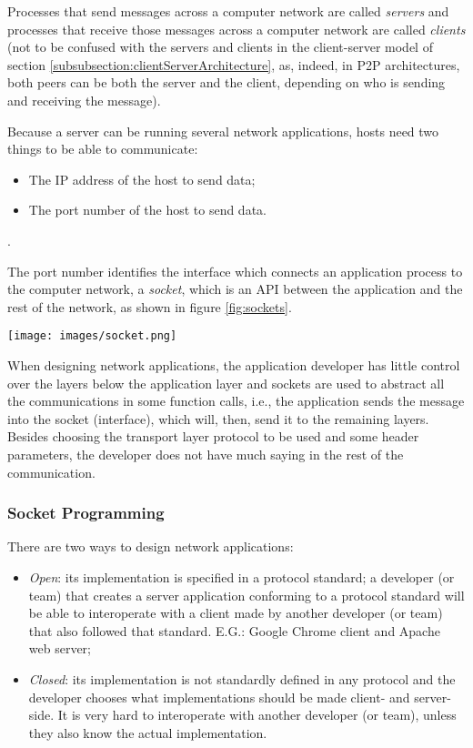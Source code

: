 Processes that send messages across a computer network are called \textit{servers} and processes that receive those messages across a computer network are called \textit{clients} (not to be confused with the servers and clients in the client-server model of section \ref{subsubsection:clientServerArchitecture}, as, indeed, in \ac{P2P} architectures, both peers can be both the server and the client, depending on who is sending and receiving the message).

Because a server can be running several network applications, hosts need two things to be able to communicate:

\begin{itemize}
  \item The \acs{IP} address of the host to send data;
  \item The port number of the host to send data.
\end{itemize}.

The port number identifies the interface which connects an application process to the computer network, a \textit{socket}, which is an \ac{API} between the application and the rest of the network, as shown in figure \ref{fig:sockets}.

\begin{figure*}[!t]
\centering
\texttt{[image: images/socket.png]}
\caption{Communication between a server and a client through the Internet using sockets}
\label{fig:sockets}
\end{figure*}

When designing network applications, the application developer has little control over the layers below the application layer and sockets are used to abstract all the communications in some function calls, i.e., the application sends the message into the socket (interface), which will, then, send it to the remaining layers. Besides choosing the transport layer protocol to be used and some header parameters, the developer does not have much saying in the rest of the communication.

\subsubsection{Socket Programming}
\label{subsubsection:socketProgramming}
There are two ways to design network applications:

\begin{itemize}
  \item \textit{Open}: its implementation is specified in a protocol standard; a developer (or team) that creates a server application conforming to a protocol standard will be able to interoperate with a client made by another developer (or team) that also followed that standard. E.G.: Google Chrome client and Apache web server;
  \item \textit{Closed}: its implementation is not standardly defined in any protocol and the developer chooses what implementations should be made client- and server-side. It is very hard to interoperate with another developer (or team), unless they also know the actual implementation.
\end{itemize}

